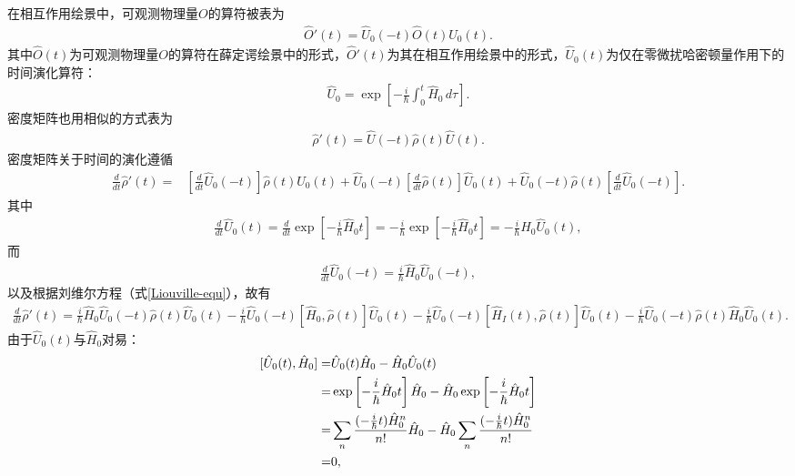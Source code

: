 \documentclass{assignment}
\begin{document}
在相互作用绘景中，可观测物理量$O$的算符被表为
\begin{align}
    \hat{O}'(t)=\hat{U}_0(-t)\hat{O}(t)\hat{U}_0(t).
\end{align}
其中$\hat{O}(t)$为可观测物理量$O$的算符在薛定谔绘景中的形式，$\hat{O}'(t)$为其在相互作用绘景中的形式，$\hat{U}_0(t)$为仅在零微扰哈密顿量作用下的时间演化算符：
\begin{align}
    \hat{U}_0=\exp\left[-\frac{i}{\hbar}\int_0^t\hat{H}_0\,d\tau\right].
\end{align}
密度矩阵也用相似的方式表为
\begin{align}
    \hat{\rho}'(t)=\hat{U}(-t)\hat{\rho}(t)\hat{U}(t).
\end{align}
密度矩阵关于时间的演化遵循
\begin{align}
    \frac{d}{dt}\hat{\rho}'(t)=&\left[\frac{d}{dt}\hat{U}_0(-t)\right]\hat{\rho}(t)\hat{U}_0(t)+\hat{U}_0(-t)\left[\frac{d}{dt}\hat{\rho}(t)\right]\hat{U}_0(t)+\hat{U}_0(-t)\hat{\rho}(t)\left[\frac{d}{dt}\hat{U}_0(-t)\right].
\end{align}
其中
\begin{align}
    \frac{d}{dt}\hat{U}_0(t)=\frac{d}{dt}\exp\left[-\frac{i}{\hbar}\hat{H}_0t\right]=-\frac{i}{\hbar}\exp\left[-\frac{i}{\hbar}\hat{H}_0t\right]=-\frac{i}{\hbar}\hat{H}_0\hat{U}_0(t),
\end{align}
而
\begin{align}
    \frac{d}{dt}\hat{U}_0(-t)=\frac{i}{\hbar}\hat{H}_0\hat{U}_0(-t),
\end{align}
以及根据刘维尔方程（式\eqref{Liouville-equ}），故有
\begin{align}
    \label{density-matrix-evolution-2}
    \frac{d}{dt}\hat{\rho}'(t)=\frac{i}{\hbar}\hat{H}_0\hat{U}_0(-t)\hat{\rho}(t)\hat{U}_0(t)-\frac{i}{\hbar}\hat{U}_0(-t)[\hat{H}_0,\hat{\rho}(t)]\hat{U}_0(t)-\frac{i}{\hbar}\hat{U}_0(-t)[\hat{H}_I(t),\hat{\rho}(t)]\hat{U}_0(t)-\frac{i}{\hbar}\hat{U}_0(-t)\hat{\rho}(t)\hat{H}_0\hat{U}_0(t).
\end{align}
由于$\hat{U}_0(t)$与$\hat{H}_0$对易：
\begin{align}
    \notag[\hat{U}_0(t),\hat{H}_0]=&\hat{U}_0(t)\hat{H}_0-\hat{H}_0\hat{U}_0(t)\\
    \notag=&\exp\left[-\frac{i}{\hbar}\hat{H}_0t\right]\hat{H}_0-\hat{H}_0\exp\left[-\frac{i}{\hbar}\hat{H}_0t\right]\\
    \notag=&\sum_n\frac{(-\frac{i}{\hbar}t)\hat{H}_0^n}{n!}\hat{H}_0-\hat{H}_0\sum_n\frac{(-\frac{i}{\hbar}t)\hat{H}_0^n}{n!}\\
    =&0,
\end{align}
\end{document}
